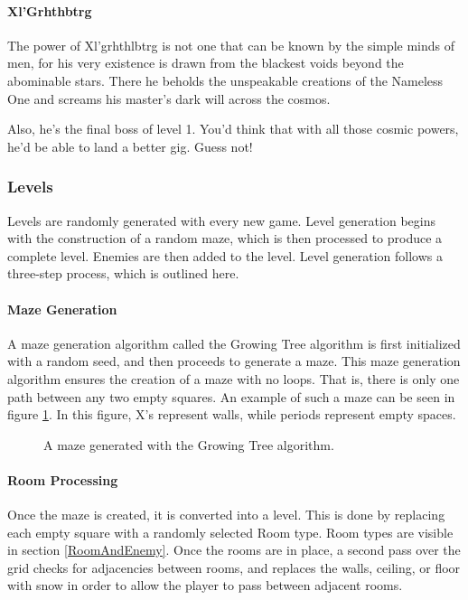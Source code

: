 \documentclass{article}
\begin{document}
\paragraph{Xl'Grhthbtrg}
The power of Xl'grhthlbtrg is not one that can be known by the simple minds of men, for his very existence is drawn from the blackest voids beyond the abominable stars. There he beholds the unspeakable creations of the Nameless One and screams his master's dark will across the cosmos.

Also, he’s the final boss of level 1.  You’d think that with all those cosmic powers, he’d be able to land a better gig.  Guess not!


\subsubsection{Levels}

Levels are randomly generated with every new game.  Level generation begins with the construction of a random maze, which is then processed to produce a complete level.  Enemies are then added to the level.  Level generation follows a three-step process, which is outlined here.

\paragraph{Maze Generation}
A maze generation algorithm called the Growing Tree algorithm is first initialized with a random seed, and then proceeds to generate a maze.  This maze generation algorithm ensures the creation of a maze with no loops.  That is, there is only one path between any two empty squares.  An example of such a maze can be seen in figure \ref{TextMaze}.  In this figure, X's represent walls, while periods represent empty spaces.

\begin{figure}[htbp]
	
	\caption{A maze generated with the Growing Tree algorithm.}
	\label{TextMaze}
\end{figure}

\paragraph{Room Processing}
Once the maze is created, it is converted into a level.  This is done by replacing each empty square with a randomly selected Room type.  Room types are visible in section \ref{RoomAndEnemy}.  Once the rooms are in place, a second pass over the grid checks for adjacencies between rooms, and replaces the walls, ceiling, or floor with snow in order to allow the player to pass between adjacent rooms.
\end{document}
